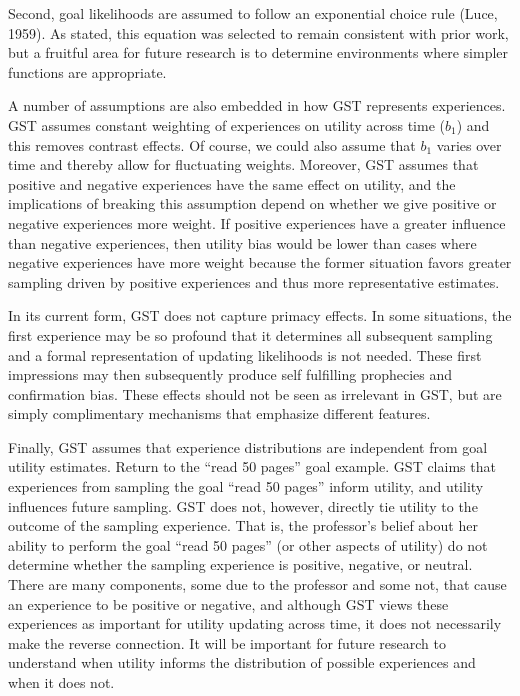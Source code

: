 \documentclass[english,,man]{apa6}
\theoremstyle{definition}
\theoremstyle{definition}
\theoremstyle{definition}
\theoremstyle{remark}
\begin{document}
Second, goal likelihoods are assumed to follow an exponential choice
rule (Luce, 1959). As stated, this equation was selected to remain
consistent with prior work, but a fruitful area for future research is
to determine environments where simpler functions are appropriate.

A number of assumptions are also embedded in how GST represents
experiences. GST assumes constant weighting of experiences on utility
across time (\(b_1\)) and this removes contrast effects. Of course, we
could also assume that \(b_1\) varies over time and thereby allow for
fluctuating weights. Moreover, GST assumes that positive and negative
experiences have the same effect on utility, and the implications of
breaking this assumption depend on whether we give positive or negative
experiences more weight. If positive experiences have a greater
influence than negative experiences, then utility bias would be lower
than cases where negative experiences have more weight because the
former situation favors greater sampling driven by positive experiences
and thus more representative estimates.

In its current form, GST does not capture primacy effects. In some
situations, the first experience may be so profound that it determines
all subsequent sampling and a formal representation of updating
likelihoods is not needed. These first impressions may then subsequently
produce self fulfilling prophecies and confirmation bias. These effects
should not be seen as irrelevant in GST, but are simply complimentary
mechanisms that emphasize different features.

Finally, GST assumes that experience distributions are independent from
goal utility estimates. Return to the \enquote{read 50 pages} goal
example. GST claims that experiences from sampling the goal
\enquote{read 50 pages} inform utility, and utility influences future
sampling. GST does not, however, directly tie utility to the outcome of
the sampling experience. That is, the professor's belief about her
ability to perform the goal \enquote{read 50 pages} (or other aspects of
utility) do not determine whether the sampling experience is positive,
negative, or neutral. There are many components, some due to the
professor and some not, that cause an experience to be positive or
negative, and although GST views these experiences as important for
utility updating across time, it does not necessarily make the reverse
connection. It will be important for future research to understand when
utility informs the distribution of possible experiences and when it
does not.
\end{document}
